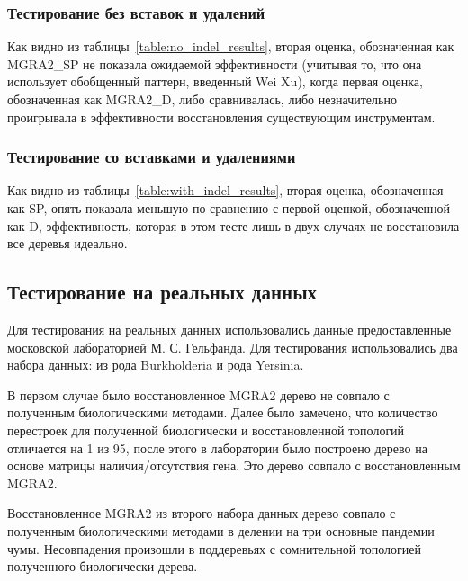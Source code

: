\subsubsection{Тестирование без вставок и удалений}

Как видно из таблицы~\ref{table:no_indel_results}, вторая оценка, обозначенная как MGRA2\_SP не показала ожидаемой эффективности
(учитывая то, что она использует обобщенный паттерн, введенный Wei Xu),
когда первая оценка, обозначенная как MGRA2\_D, либо сравнивалась, либо незначительно проигрывала в эффективности восстановления существующим инструментам.

\subsubsection{Тестирование со вставками и удалениями}

Как видно из таблицы~\ref{table:with_indel_results}, вторая оценка, обозначенная как SP, опять показала меньшую
по сравнению с первой оценкой, обозначенной как D, эффективность, которая в этом тесте лишь в двух случаях не восстановила все деревья идеально.

\subsection{Тестирование на реальных данных}
Для тестирования на реальных данных использовались данные предоставленные московской лабораторией М. С. Гельфанда.
Для тестирования использовались два набора данных: из рода Burkholderia и рода Yersinia.

В первом случае было восстановленное MGRA2 дерево не совпало с полученным биологическими методами.
Далее было замечено, что количество перестроек для полученной биологически и восстановленной топологий отличается на 1 из 95,
после этого в лаборатории было построено дерево на основе матрицы наличия/отсутствия гена.
Это дерево совпало с восстановленным MGRA2.

Восстановленное MGRA2 из второго набора данных дерево совпало с полученным биологическими методами в делении на три основные пандемии чумы.
Несовпадения произошли в поддеревьях с сомнительной топологией полученного биологически дерева.
